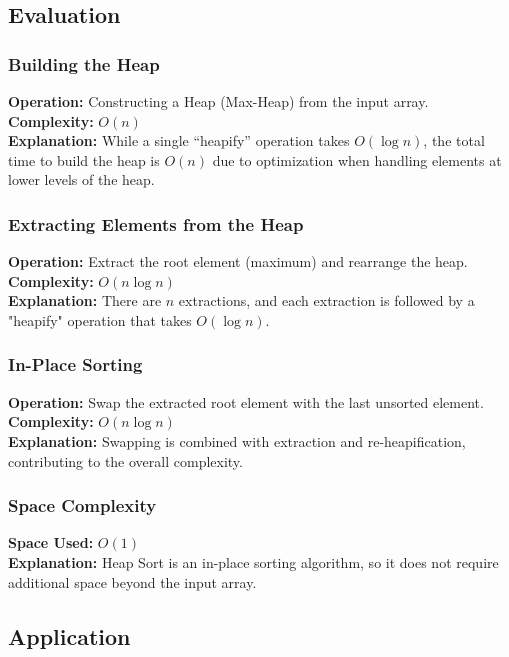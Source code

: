 \subsection{Evaluation}

\subsubsection{Building the Heap}
\textbf{Operation:} Constructing a Heap (Max-Heap) from the input array. \\
\textbf{Complexity:} $O(n)$ \\
\textbf{Explanation:} While a single “heapify” operation takes $O(\log n)$, the total time to build the heap is $O(n)$ due to optimization when handling elements at lower levels of the heap.

\subsubsection{Extracting Elements from the Heap}
\textbf{Operation:} Extract the root element (maximum) and rearrange the heap. \\
\textbf{Complexity:} $O(n \log n)$ \\
\textbf{Explanation:} There are $n$ extractions, and each extraction is followed by a "heapify" operation that takes $O(\log n)$.

\subsubsection{In-Place Sorting}
\textbf{Operation:} Swap the extracted root element with the last unsorted element. \\
\textbf{Complexity:} $O(n \log n)$ \\
\textbf{Explanation:} Swapping is combined with extraction and re-heapification, contributing to the overall complexity.

\subsubsection{Space Complexity}
\textbf{Space Used:} $O(1)$ \\
\textbf{Explanation:} Heap Sort is an in-place sorting algorithm, so it does not require additional space beyond the input array.

\subsection{Application}

